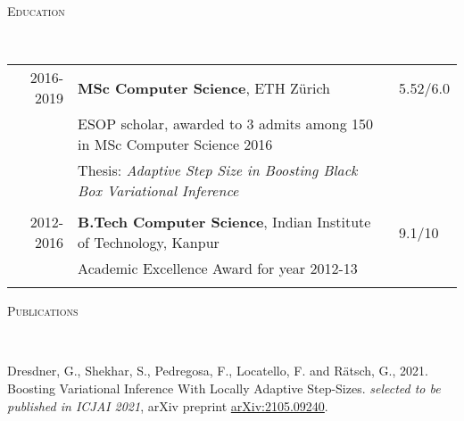\documentclass[9pt]{article}
\renewcommand{\arraystretch}{1.5}
\newenvironment{changemargin}[2]{%
  \begin{list}{}{%
      \setlength{\topsep}{0pt}%
    \setlength{\leftmargin}{#1}%
    \setlength{\rightmargin}{#2}%
    \setlength{\listparindent}{\parindent}%
  \setlength{\itemindent}{\parindent}%
    \setlength{\parsep}{\parskip}%
    }%
  \item[]}{\end{list}
    }
\newcommand{\lineover}{
  \begin{changemargin}{-0.05in}{-0.10in}
    \vspace*{-9pt}
    \hrulefill \\
    \vspace*{-2pt}
  \end{changemargin}
}
\newcommand{\header}[1]{
  \begin{changemargin}{-0.5in}{-0.5in}
    \scshape{#1}\\
        \lineover
  \end{changemargin}
}
\begin{document}
\header{Education}
\vspace{4pt}
  \renewcommand{\arraystretch}{1}
  \begin{tabular}{rll}
    2016-2019 & \textbf{MSc Computer Science},  ETH Z{\"u}rich  & 5.52/6.0 \\
            & ESOP scholar, awarded to 3 admits among 150 in MSc Computer Science 2016 &\\
            & Thesis: \emph{Adaptive Step Size in Boosting Black Box Variational Inference} &\\\\
    2012-2016 & \textbf{B.Tech Computer Science},  Indian Institute of Technology, Kanpur & 9.1/10 \\ 
            &  Academic Excellence Award for year 2012-13 & \\\\
  \end{tabular}

\header{Publications}
Dresdner, G., Shekhar, S., Pedregosa, F., Locatello, F. and Rätsch, G., 2021. Boosting Variational Inference With Locally Adaptive Step-Sizes. \textit{selected to be published in ICJAI 2021}, arXiv preprint \href{https://arxiv.org/abs/2105.09240}{arXiv:2105.09240}.
\end{document}
